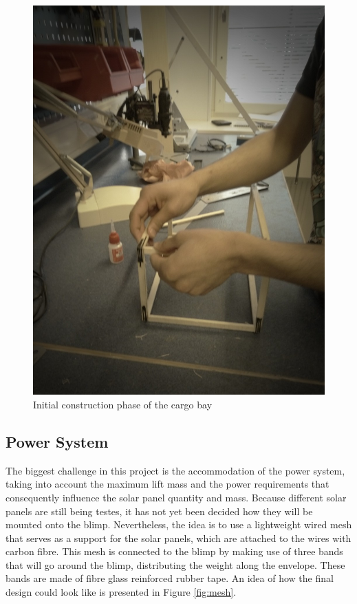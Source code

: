 \begin{figure}[th!]
\centering
\includegraphics[scale=0.5]{figures/boxinit.jpg}
\caption{Initial construction phase of the cargo bay}
\label{fig:boxinit}
\end{figure}

\subsection{Power System}

The biggest challenge in this project is the accommodation of the power system, taking into account the maximum lift mass and the power requirements that consequently influence the solar panel quantity and mass. Because different solar panels are still being testes, it has not yet been decided how they will be mounted onto the blimp. Nevertheless, the idea is to use a lightweight wired mesh that serves as a support for the solar panels, which are attached to the wires with carbon fibre. This mesh is connected to the blimp by making use of three bands that will go around the blimp, distributing the weight along the envelope. These bands are made of fibre glass reinforced rubber tape. An idea of how the final design could look like is presented in Figure \ref{fig:mesh}.

